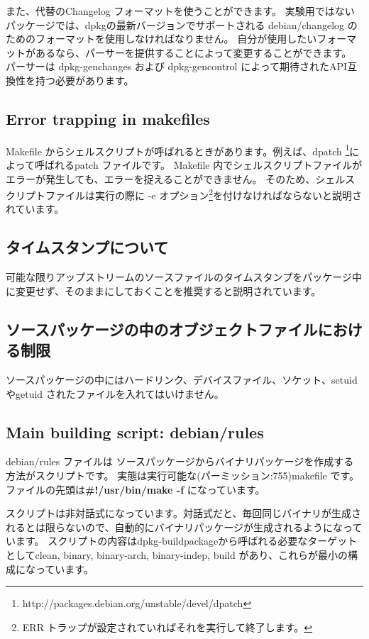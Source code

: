 \documentclass[mingoth,a4paper]{jsarticle}
\begin{document}
 また、代替のChangelog フォーマットを使うことができます。
 実験用ではないパッケージでは、dpkgの最新バージョンでサポートされる debian/changelog のためのフォーマットを使用しなければなりません。
 自分が使用したいフォーマットがあるなら、パーサーを提供することによって変更することができます。
 パーサーは dpkg-genchanges および dpkg-gencontrol によって期待されたAPI互換性を持つ必要があります。

\subsection{Error trapping in makefiles}
 Makefile からシェルスクリプトが呼ばれるときがあります。例えば、dpatch \footnote{http://packages.debian.org/unstable/devel/dpatch}によって呼ばれるpatch ファイルです。
 Makefile 内でシェルスクリプトファイルがエラーが発生しても、エラーを捉えることができません。
 そのため、シェルスクリプトファイルは実行の際に -e オプション\footnote{ERR トラップが設定されていればそれを実行して終了します。}を付けなければならないと説明されています。

\subsection{タイムスタンプについて}
可能な限りアップストリームのソースファイルのタイムスタンプをパッケージ中に変更せず、そのままにしておくことを推奨すると説明されています。

\subsection{ソースパッケージの中のオブジェクトファイルにおける制限}
ソースパッケージの中にはハードリンク、デバイスファイル、ソケット、setuid やgetuid されたファイルを入れてはいけません。

\subsection{Main building script: debian/rules}
debian/rules ファイルは ソースパッケージからバイナリパッケージを作成する方法がスクリプトです。
実態は実行可能な(パーミッション:755)makefile です。
ファイルの先頭は{\bf \#!/usr/bin/make -f} になっています。

スクリプトは非対話式になっています。対話式だと、毎回同じバイナリが生成されるとは限らないので、自動的にバイナリパッケージが生成されるようになっています。
スクリプトの内容はdpkg-buildpackageから呼ばれる必要なターゲットとしてclean, binary, binary-arch, binary-indep, build があり、これらが最小の構成になっています。
\end{document}
